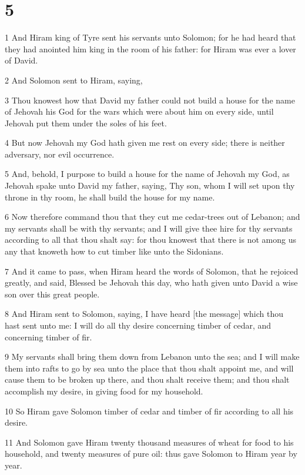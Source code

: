 \chapter{5}

\par 1 And Hiram king of Tyre sent his servants unto Solomon; for he had heard that they had anointed him king in the room of his father: for Hiram was ever a lover of David.
\par 2 And Solomon sent to Hiram, saying,
\par 3 Thou knowest how that David my father could not build a house for the name of Jehovah his God for the wars which were about him on every side, until Jehovah put them under the soles of his feet.
\par 4 But now Jehovah my God hath given me rest on every side; there is neither adversary, nor evil occurrence.
\par 5 And, behold, I purpose to build a house for the name of Jehovah my God, as Jehovah spake unto David my father, saying, Thy son, whom I will set upon thy throne in thy room, he shall build the house for my name.
\par 6 Now therefore command thou that they cut me cedar-trees out of Lebanon; and my servants shall be with thy servants; and I will give thee hire for thy servants according to all that thou shalt say: for thou knowest that there is not among us any that knoweth how to cut timber like unto the Sidonians.
\par 7 And it came to pass, when Hiram heard the words of Solomon, that he rejoiced greatly, and said, Blessed be Jehovah this day, who hath given unto David a wise son over this great people.
\par 8 And Hiram sent to Solomon, saying, I have heard [the message] which thou hast sent unto me: I will do all thy desire concerning timber of cedar, and concerning timber of fir.
\par 9 My servants shall bring them down from Lebanon unto the sea; and I will make them into rafts to go by sea unto the place that thou shalt appoint me, and will cause them to be broken up there, and thou shalt receive them; and thou shalt accomplish my desire, in giving food for my household.
\par 10 So Hiram gave Solomon timber of cedar and timber of fir according to all his desire.
\par 11 And Solomon gave Hiram twenty thousand measures of wheat for food to his household, and twenty measures of pure oil: thus gave Solomon to Hiram year by year.
